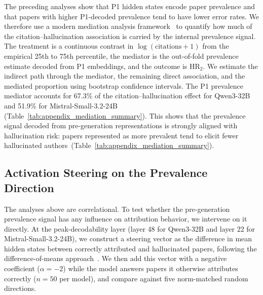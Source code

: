 \documentclass[11pt]{article}
\begin{document}
The preceding analyses show that P1 hidden states encode paper prevalence and
that papers with higher P1-decoded prevalence tend to have lower error rates.   We therefore use a modern mediation analysis framework~\citep{imai2010general, tingley2014mediation} to quantify how much of the citation--hallucination association is carried by the internal prevalence signal. The treatment is a continuous contrast in $\log(\mathrm{citations}+1)$ from the empirical 25th to 75th percentile, the mediator is the out-of-fold prevalence estimate decoded from P1 embeddings, and the outcome is HR$_2$. We estimate the indirect path through the mediator, the remaining direct association, and the mediated proportion using bootstrap confidence intervals. The P1 prevalence mediator accounts for 67.3\% of the citation--hallucination effect for
Qwen3-32B and 51.9\% for Mistral-Small-3.2-24B (Table~\ref{tab:appendix_mediation_summary}). This shows that the prevalence signal decoded from pre-generation representations is strongly aligned with hallucination risk: papers represented as more prevalent tend to elicit fewer hallucinated authors~(Table~\ref{tab:appendix_mediation_summary}).

\begin{table}[t]
\centering

\caption{Mediation analysis using the P1-decoded internal prevalence signal. The mediator is the out-of-fold predicted prevalence score
decoded from the model's pre-generation hidden representation, and the outcome is HR$_2$.}
\label{tab:appendix_mediation_summary}
\end{table}

\subsection{Activation Steering on the Prevalence Direction}
\label{sec:appendix_steering}

The analyses above are correlational. To test whether the pre-generation prevalence signal has any influence on attribution behavior, we intervene on it directly. At the peak-decodability layer (layer 48 for Qwen3-32B and layer 22 for Mistral-Small-3.2-24B), we construct a steering vector as the difference in mean hidden states between correctly attributed and hallucinated papers, following the difference-of-means approach~\citep{rimsky-etal-2024-steering}. We then add this vector with a negative coefficient ($\alpha = -2$) while the model answers papers it otherwise attributes correctly ($n = 50$ per model), and compare against five norm-matched random directions.
\end{document}
